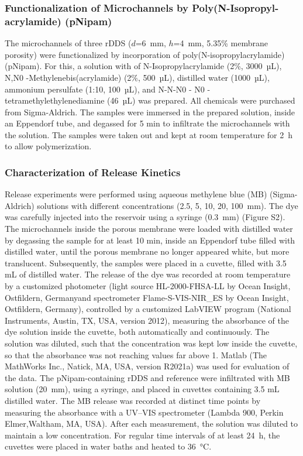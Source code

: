 \subsubsection{Functionalization of Microchannels by Poly(N-Isopropyl-\\acrylamide) (pNipam)} 
The microchannels of three rDDS ($d$=6~mm, $h$=4~mm, 5.35\% membrane porosity) were functionalized by incorporation of poly(N-isopropylacrylamide) (pNipam). For this, a solution with of N-Isopropylacrylamide (2\%, 3000~µL), N,N0 -Methylenebis(acrylamide) (2\%, 500~µL), distilled water (1000~µL), ammonium persulfate (1:10, 100~µL), and N-N-N0 - N0 -tetramethylethylenediamine (46~µL) was prepared. All chemicals were purchased from Sigma-Aldrich. The samples were immersed in the prepared solution, inside an Eppendorf tube, and degassed for 5 min to infiltrate the microchannels with the solution. The samples were taken out and kept at room temperature for 2~h to allow polymerization.

\subsubsection{Characterization of Release Kinetics}
Release experiments were performed using aqueous methylene blue (MB) (Sigma-Aldrich) solutions with different concentrations (2.5, 5, 10, 20, 100~mm). The dye was carefully injected into the reservoir using a syringe (0.3~mm) (Figure S2). The microchannels inside the porous membrane were loaded with distilled water by degassing the sample for at least 10 min, inside an Eppendorf tube filled with distilled water, until the porous membrane no longer appeared white, but more translucent. Subsequently, the samples were placed in a cuvette, filled with 3.5 mL of distilled water. The release of the dye was recorded at room temperature by a customized photometer (light source HL-2000-FHSA-LL by Ocean Insight, Ostfildern, Germanyand spectrometer Flame-S-VIS-NIR\_ES by Ocean Insight, Ostfildern, Germany), controlled by a customized LabVIEW program (National Instruments, Austin, TX, USA, version 2012), measuring the absorbance of the dye solution inside the cuvette, both automatically and continuously. The solution was diluted, such that the concentration was kept low inside the cuvette, so that the absorbance was not reaching values far above 1. Matlab (The MathWorks Inc., Natick, MA, USA, version R2021a) was used for evaluation of the data. The pNipam-containing rDDS and reference were infiltrated with MB solution (20~mm), using a syringe, and placed in cuvettes containing 3.5 mL distilled water. The MB release was recorded at distinct time points by measuring the absorbance with a UV–VIS spectrometer (Lambda 900, Perkin Elmer,Waltham, MA, USA). After each measurement, the solution was diluted to maintain a low concentration. For regular time intervals of at least 24~h, the cuvettes were placed in water baths and heated to 36~°C.

